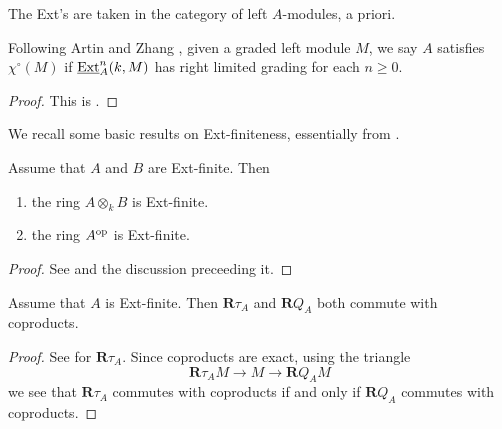 \documentclass[dissertation.tex]{subfiles}
\begin{document}
\begin{remark}
  The Ext's are taken in the category of left \(A\)-modules, a priori. 
\end{remark}

\begin{definition} \label{definition: chi}
  Following Artin and Zhang \cite{AZ}, given a graded left module \(M\), we say \(A\) satisfies \(\chi^\circ(M)\) if \(\underline{\operatorname{Ext}}^n_A(k,M)\) has right limited grading for each \(n \geq 0\). 

\end{definition}

\begin{proof}
  This is \cite[Proposition 3.8 (1)]{AZ}.
\end{proof}

We recall some basic results on Ext-finiteness, essentially from \cite[Section 4]{VdB}.

\begin{proposition} \label{proposition: tensor and op properties of ext-finite}
  Assume that \(A\) and \(B\) are Ext-finite. Then
  \begin{enumerate}
  \item the ring \(A \otimes_k B\) is Ext-finite. 
  \item the ring \(A^{\operatorname{op}}\) is Ext-finite.
  \end{enumerate}
\end{proposition}

\begin{proof}
  See \cite[Lemma 4.2]{VdB} and the discussion preceeding it. 
\end{proof}

\begin{proposition} \label{proposition: derived Q commutes with coproducts}
  Assume that \(A\) is Ext-finite. Then \(\mathbf{R}\tau_A\) and \(\mathbf{R}Q_A\) both commute with coproducts. 
\end{proposition}

\begin{proof}
  See \cite[Lemma 4.3]{VdB} for \(\mathbf{R}\tau_A\). Since coproducts are exact, using the triangle
  \begin{displaymath}
    \mathbf{R}\tau_A M \to M \to \mathbf{R}Q_A M 
  \end{displaymath}
  we see that \(\mathbf{R}\tau_A\) commutes with coproducts if and only if \(\mathbf{R}Q_A\) commutes with coproducts. 
\end{proof}
\end{document}
